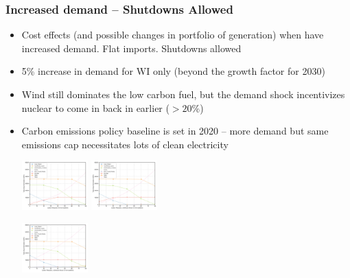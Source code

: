 \documentclass[xcolor=dvipsnames]{beamer}
\begin{document}
\begin{frame}
  \frametitle{Increased demand -- Shutdowns Allowed}

\begin{itemize}
  \item Cost effects (and possible changes in portfolio of generation) when
have increased demand.  Flat imports. Shutdowns allowed
  \item 5\% increase in demand for WI only (beyond the growth factor for 2030)
  \item Wind still dominates the low carbon fuel, but the demand shock incentivizes nuclear to come in back in earlier ($>20$\%)
  \item Carbon emissions policy baseline is set in 2020 -- more demand but same emissions cap necessitates lots of clean electricity

  \includegraphics[width=0.2\textwidth]{includes/no_leakage_shutdowns_agg_generation_cntlreg.png}
  \includegraphics[width=0.2\textwidth]{includes/no_leakage_demand_shock_agg_generation_cntlreg.png}

  \includegraphics[width=0.2\textwidth]{includes/no_leakage_demand_shock_agg_generation_cntlreg_2.png}

%
%

\end{itemize}

\end{frame}
\end{document}
